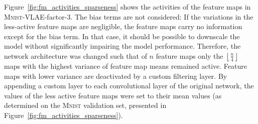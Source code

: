 Figure~\ref{fig:fm_activities_sparseness} shows the activities of the feature maps in \textsc{Mnist}-\ac{VLAE}-factor-3.
The bias terms are not considered:
If the variations in the less-active feature maps are negligible, the feature maps carry no information except for the bias term.
In that case, it should be possible to downscale the model without significantly impairing the model performance.
Therefore, the network architecture was changed such that of $n$ feature maps only the $\left \lfloor \frac{n}{4} \right \rfloor$ maps with the highest variance of feature map means remained active.
Feature maps with lower variance are deactivated by a custom filtering layer.
By appending a custom layer to each convolutional layer of the original network, the values of the less active feature maps were set to their mean values (as determined on the \textsc{Mnist} validation set, presented in Figure~\ref{fig:fm_activities_sparseness}).

